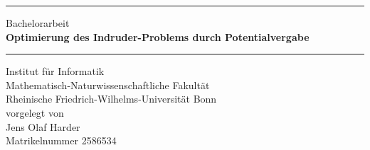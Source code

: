 
\begin{titlepage}

\renewcommand{\baselinestretch}{2}\normalsize


\rule{\textwidth}{0.4pt}

\vspace{1cm}

\begin{center}
    {\LARGE Bachelorarbeit} \\
    \textbf{\Huge Optimierung des Indruder-Problems durch Potentialvergabe}
\end{center}

\vspace{1cm}
\rule{\textwidth}{0.4pt}
\vspace{0.5cm}

\begin{center}

    \vspace{0.5cm}
    Institut für Informatik \\
    Mathematisch-Naturwissenschaftliche Fakultät \\
    Rheinische Friedrich-Wilhelms-Universität Bonn \\[0.5cm]
    vorgelegt von \\
    \vspace{0.5cm}
    {\Large Jens Olaf Harder} \\
    Matrikelnummer  2586534 \\
\end{center}


%
%


\end{titlepage}
